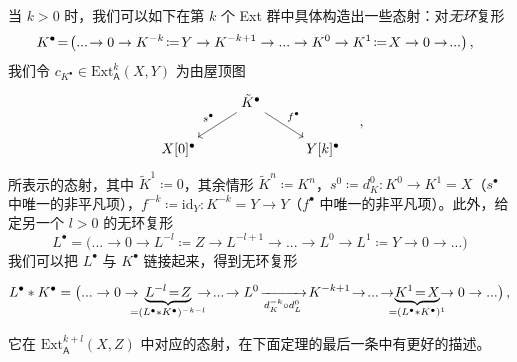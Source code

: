 
\begin{Rem}\label{explicitExtmorph}
	当 $k>0$ 时，我们可以如下在第 $k$ 个 Ext 群中具体构造出一些态射：对\textit{无环}复形
	\begin{equation}\label{Extcomplex}
		\mkern-12mu K^\bullet\!=\!\big(...\!\rightarrow 0\rightarrow K^{-k}\!\coloneqq\! Y\rightarrow K^{-k+1}\rightarrow...\rightarrow K^0\rightarrow K^1\!\coloneqq\! X\rightarrow 0\rightarrow\!...\big)\,,
	\end{equation}
	我们令 $c_{K^\bullet}\in\text{Ext}_\mathsf{A}^k(X,Y)$ 为由屋顶图
	\begin{equation}\label{Extroof}
		\begin{tikzcd}
			& \tilde{K}^\bullet\arrow[dl, "s^\bullet"']\arrow[dr, "f^\bullet"] & \\
			X[0]^\bullet & & Y[k]^\bullet
		\end{tikzcd}\quad,
	\end{equation}
	所表示的态射，其中 $\tilde{K}^1\coloneqq 0$，其余情形 $\tilde{K}^n\coloneqq K^n$，$s^0\coloneqq d_K^0:K^0\rightarrow K^1=X$（$s^\bullet$ 中唯一的非平凡项），$f^{-k}\coloneqq\text{id}_Y:K^{-k}=Y\rightarrow Y$（$f^\bullet$ 中唯一的非平凡项）。此外，给定另一个 $l>0$ 的无环复形
	\[
	L^\bullet=\big(...\rightarrow 0\rightarrow L^{-l}\coloneqq Z\rightarrow L^{-l+1}\rightarrow...\rightarrow L^0\rightarrow L^1\coloneqq Y\rightarrow 0\rightarrow...\big)
	\]
	我们可以把 $L^\bullet$ 与 $K^\bullet$ 链接起来，得到无环复形
	\begin{small}\begin{equation}\label{astcomplex}
			L^\bullet\ast K^\bullet=\big(...\rightarrow 0\rightarrow \mkern-16mu \underbrace{L^{-l}\!=\!Z}_{=(L^\bullet\ast K^\bullet)^{-k-l}}\mkern-16mu\rightarrow \!...\!\rightarrow L^0\!\xrightarrow[d_K^{-k}\circ d_L^0]{}\! K^{-k+1}\!\rightarrow\! ...\!\rightarrow \mkern-12mu\underbrace{K^1\!=\!X}_{=(L^\bullet\ast K^\bullet)^1}\mkern-12mu\rightarrow 0\rightarrow...\big)\,,
	\end{equation}\end{small}
	\!\!它在 $\text{Ext}_\mathsf{A}^{k+l}(X,Z)$ 中对应的态射，在下面定理的最后一条中有更好的描述。
\end{Rem}

